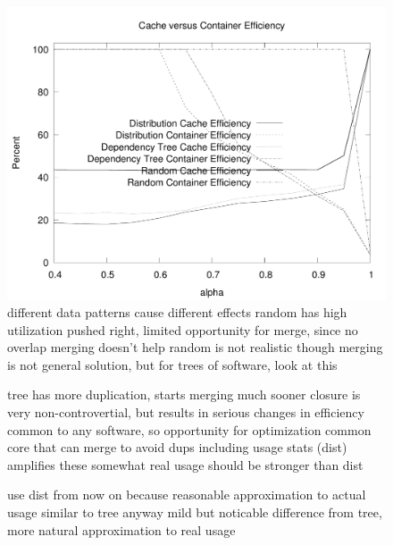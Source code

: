 \documentclass[sigconf]{acmart}
\begin{document}
\begin{figure}
\includegraphics[width=\linewidth]{curated/comparative/distribution_efficiency_comp.pdf}
\label{fig:comp-eff}
different data patterns cause different effects
random has high utilization
pushed right, limited opportunity for merge, since no overlap
merging doesn't help
random is not realistic though
merging is not general solution, but for trees of software, look at this

tree has more duplication, starts merging much sooner
closure is very non-controvertial, but results in serious changes in efficiency
common to any software, so opportunity for optimization
common core that can merge to avoid dups
including usage stats (dist) amplifies these somewhat
real usage should be stronger than dist

use dist from now on because reasonable approximation to actual usage
similar to tree anyway
mild but noticable difference from tree, more natural approximation to real usage
\fi
\end{figure}
\end{document}
